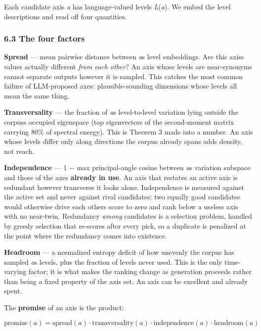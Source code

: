 \documentclass[
  10pt,
]{article}
\theoremstyle{plain}
\theoremstyle{definition}
\begin{document}
Each candidate axis \emph{a} has language-valued levels
\emph{L}(\emph{a}). We embed the level descriptions and read off four
quantities.

\subsubsection{6.3 The four factors}\label{63-the-four-factors}

\textbf{Spread} --- mean pairwise distance between
\emph{a}\textquotesingle s level embeddings. Are this
axis\textquotesingle s values actually different \emph{from each other}?
An axis whose levels are near-synonyms cannot separate outputs however
it is sampled. This catches the most common failure of LLM-proposed
axes: plausible-sounding dimensions whose levels all mean the same
thing.

\textbf{Transversality} --- the fraction of \emph{a}\textquotesingle s
level-to-level variation lying outside the corpus\textquotesingle s
occupied eigenspace (top eigenvectors of the second-moment matrix
carrying 80\% of spectral energy). This is Theorem 3 made into a number.
An axis whose levels differ only along directions the corpus already
spans adds density, not reach.

\textbf{Independence} --- 1 − max principal-angle cosine between
\emph{a}\textquotesingle s variation subspace and those of the axes
\textbf{already in use}. An axis that restates an active axis is
redundant however transverse it looks alone. Independence is measured
against the active set and never against rival candidates: two equally
good candidates would otherwise drive each other\textquotesingle s score
to zero and rank below a useless axis with no near-twin. Redundancy
\emph{among} candidates is a selection problem, handled by greedy
selection that re-scores after every pick, so a duplicate is penalized
at the point where the redundancy comes into existence.

\textbf{Headroom} --- a normalized entropy deficit of how unevenly the
corpus has sampled \emph{a}\textquotesingle s levels, plus the fraction
of levels never used. This is the only time-varying factor; it is what
makes the ranking change as generation proceeds rather than being a
fixed property of the axis set. An axis can be excellent and already
spent.

The \textbf{promise} of an axis is the product:

\[
\mathrm{promise}(a) = \mathrm{spread}(a)\cdot\mathrm{transversality}(a)\cdot\mathrm{independence}(a)\cdot\mathrm{headroom}(a)
\]
\end{document}
